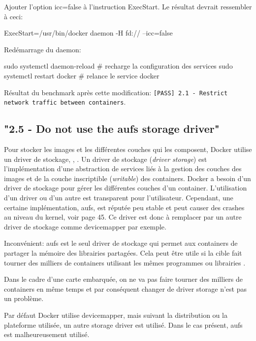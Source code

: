 \documentclass[11pt,a4paper,oneside]{report}
\newcommand{\code}[1]{\texttt{#1}}
\begin{document}
Ajouter l'option icc=false à l'instruction ExecStart. Le résultat devrait ressembler à ceci:

\begin{bashcode}
ExecStart=/usr/bin/docker daemon -H fd:// --icc=false
\end{bashcode}

Redémarrage du daemon:

\begin{bashcode}
sudo systemctl daemon-reload # recharge la configuration des services
sudo systemctl restart docker # relance le service docker
\end{bashcode}

Résultat du benchmark après cette modification: \code{[PASS] 2.1 - Restrict network traffic between containers}.

\subsection{"2.5 - Do not use the aufs storage driver"}
Pour stocker les images et les différentes couches qui les composent, Docker utilise un driver de stockage\cite{understanding_image_container_driver_storage}, \cite{docker_select_a_driver}, \cite{jpetazzoni_device_driver}. Un driver de stockage (\textit{driver storage}) est l'implémentation d'une abstraction de services liés à la gestion des couches des images et de la couche inscriptible (\textit{writable}) des containers. Docker a besoin d'un driver de stockage pour gérer les différentes couches d'un container. L'utilisation d'un driver ou d'un autre est transparent pour l'utilisateur. Cependant, une certaine implémentation, aufs, est réputée peu stable et peut causer des crashes au niveau du kernel, voir \cite{cis_benchmark} page 45. Ce driver est donc à remplacer par un autre driver de stockage comme devicemapper par exemple.

Inconvénient: aufs est le seul driver de stockage qui permet aux containers de partager la mémoire des librairies partagées. Cela peut être utile si la cible fait tourner des milliers de containers utilisant les mêmes programmes ou librairies \cite{cis_benchmark}.

Dans le cadre d'une carte embarquée, on ne va pas faire tourner des milliers de containers en même temps et par conséquent changer de driver storage n'est pas un problème.

Par défaut Docker utilise devicemapper, mais suivant la distribution ou la plateforme utilisée, un autre storage driver est utilisé. Dans le cas présent, aufs est malheureusement utilisé.
\end{document}
